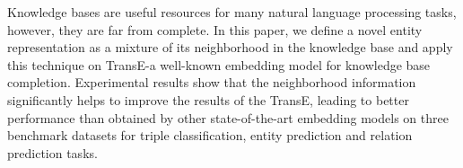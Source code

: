 Knowledge bases are useful resources for many natural language processing tasks, however, they are far from complete. In this paper, we define a novel entity representation as a mixture of its neighborhood in the knowledge base and apply this technique on TransE-a well-known embedding model for knowledge base completion. Experimental results show that the neighborhood information significantly helps to improve the results of the TransE, leading to better performance than obtained by other state-of-the-art embedding models on three benchmark datasets for triple classification, entity prediction and relation prediction tasks.
